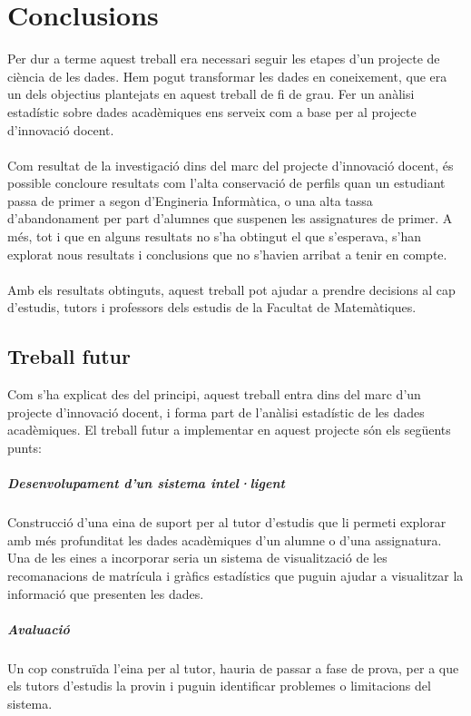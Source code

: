 \documentclass[12pt,a4paper,catalan]{article}
\begin{document}
\newpage
\section{Conclusions}
Per dur a terme aquest treball era necessari seguir les etapes d'un projecte de ciència de les dades. Hem pogut transformar les dades en coneixement, que era un dels objectius plantejats en aquest treball de fi de grau. Fer un anàlisi estadístic sobre dades acadèmiques ens serveix com a base per al projecte d'innovació docent.
\\
\\
Com resultat de la investigació dins del marc del projecte d'innovació docent, és possible concloure resultats com l'alta conservació de perfils quan un estudiant passa de primer a segon d'Engineria Informàtica, o una alta tassa d'abandonament per part d'alumnes que suspenen les assignatures de primer. A més, tot i que en alguns resultats no s'ha obtingut el que s'esperava, s'han explorat nous resultats i conclusions que no s'havien arribat a tenir en compte.
\\
\\
Amb els resultats obtinguts, aquest treball pot ajudar a prendre decisions al cap d'estudis, tutors i professors dels estudis de la Facultat de Matemàtiques.

\subsection{Treball futur}
Com s'ha explicat des del principi, aquest treball entra dins del marc d'un projecte d'innovació docent, i forma part de l'anàlisi estadístic de les dades acadèmiques. El treball futur a implementar en aquest projecte són els següents punts:

\subparagraph{Desenvolupament d'un sistema intel·ligent} 
Construcció d'una eina de suport per al tutor d'estudis que li permeti explorar amb més profunditat les dades acadèmiques d'un alumne o d'una assignatura. Una de les eines a incorporar seria un sistema de visualització de les recomanacions de matrícula i gràfics estadístics que puguin ajudar a visualitzar la informació que presenten les dades.

\subparagraph{Avaluació}
Un cop construïda l'eina per al tutor, hauria de passar a fase de prova, per a que els tutors d'estudis la provin i puguin identificar problemes o limitacions del sistema.

\newpage
\end{document}
